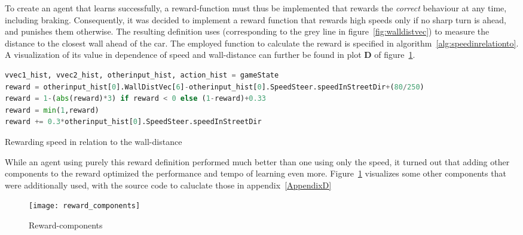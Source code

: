 To create an agent that learns successfully, a reward-function must thus be implemented that rewards the \textit{correct} behaviour at any time, including braking. Consequently, it was decided to implement a reward function that rewards high speeds only if no sharp turn is ahead, and punishes them otherwise. The resulting definition uses  (corresponding to the grey line in figure~\ref{fig:walldistvec}) to measure the distance to the closest wall ahead of the car. The employed function to calculate the reward is specified in algorithm~\ref{alg:speedinrelationto}. A visualization of its value in dependence of speed and wall-distance can further be found in plot \textbf{D} of figure~\ref{fig:reward}.


\begin{algorithm}[h]
	\begin{lstlisting}[language=Python, style=Python, frame=none]
vvec1_hist, vvec2_hist, otherinput_hist, action_hist = gameState
reward = otherinput_hist[0].WallDistVec[6]-otherinput_hist[0].SpeedSteer.speedInStreetDir+(80/250)
reward = 1-(abs(reward)*3) if reward < 0 else (1-reward)+0.33
reward = min(1,reward)
reward += 0.3*otherinput_hist[0].SpeedSteer.speedInStreetDir
	\end{lstlisting}%
	\caption{Rewarding speed in relation to the wall-distance}
	\label{alg:speedinrelationto}
\end{algorithm}

While an agent using purely this reward definition performed much better than one using only the speed, it turned out that adding other components to the reward optimized the performance and tempo of learning even more. Figure~\ref{fig:reward} visualizes some other components that were additionally used, with the source code to caluclate those in appendix~\ref{AppendixD}

\begin{figure}[h]
	\centering 
	\begin{annotatedFigure}
		{\texttt{[image: reward\_components]}}
	\end{annotatedFigure}
	\caption{Reward-components}
	\label{fig:reward}
\end{figure}

